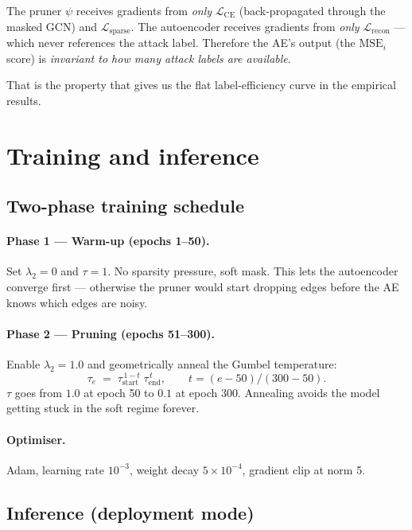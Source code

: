 \documentclass[11pt,a4paper]{article}
\begin{document}
The pruner $\psi$ receives gradients from \emph{only}
$\mathcal{L}_{\text{CE}}$ (back-propagated through the masked GCN) and
$\mathcal{L}_{\text{sparse}}$. The autoencoder receives gradients
from \emph{only} $\mathcal{L}_{\text{recon}}$ --- which never references
the attack label. Therefore the AE's output (the $\mathrm{MSE}_i$
score) is \emph{invariant to how many attack labels are available}.

That is the property that gives us the flat label-efficiency curve in
the empirical results.

\section{Training and inference}

\subsection{Two-phase training schedule}

\paragraph{Phase 1 --- Warm-up (epochs 1--50).}
Set $\lambda_2 = 0$ and $\tau = 1$. No sparsity pressure, soft mask.
This lets the autoencoder converge first --- otherwise the pruner
would start dropping edges before the AE knows which edges are noisy.

\paragraph{Phase 2 --- Pruning (epochs 51--300).}
Enable $\lambda_2 = 1.0$ and geometrically anneal the Gumbel
temperature:
\begin{equation}
\tau_e \;=\; \tau_{\text{start}}^{\,1-t}\;\tau_{\text{end}}^{\,t},
\qquad t = (e-50) / (300-50).
\end{equation}
$\tau$ goes from $1.0$ at epoch 50 to $0.1$ at epoch 300. Annealing
avoids the model getting stuck in the soft regime forever.

\paragraph{Optimiser.} Adam, learning rate $10^{-3}$, weight decay
$5\times 10^{-4}$, gradient clip at norm 5.

\subsection{Inference (deployment mode)}
\end{document}
